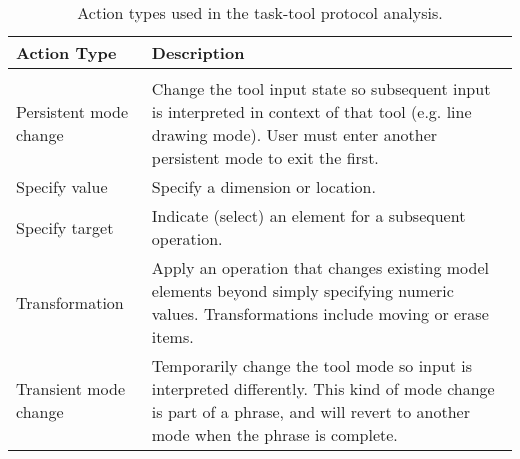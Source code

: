 
\begin{table}%
\centering
\begin{tabular}{l | p{11cm}}
\textbf{Action Type} & \textbf{Description} \\
\hline
&\\

Persistent mode change & 

Change the tool input state so subsequent input is interpreted in
context of that tool (e.g. line drawing mode). User must enter another
persistent mode to exit the first.

\\

Specify value &

Specify a dimension or location.

\\

Specify target &

Indicate (select) an element for a subsequent operation.

\\

Transformation &

Apply an operation that changes existing model elements beyond simply
specifying numeric values. Transformations include moving or erase
items.

\\

Transient mode change &

Temporarily change the tool mode so input is interpreted
differently. This kind of mode change is part of a phrase, and will
revert to another mode when the phrase is complete.

\\
\hline
\end{tabular}
\caption[Task-Tool Protocol Analysis Categories]{Action types used in the task-tool protocol analysis.}
\label{tab:task-tool-protocol}
\end{table}
